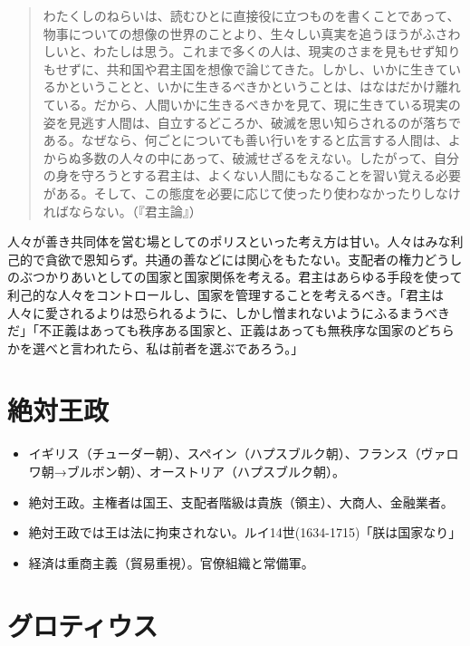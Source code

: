 \documentclass[uplatex,dvipdfmx]{jsarticle} \usepackage{mystyle}%
\begin{document}
\begin{quote}
  わたくしのねらいは、読むひとに直接役に立つものを書くことであって、物事についての想像の世界のことより、生々しい真実を追うほうがふさわしいと、わたしは思う。これまで多くの人は、現実のさまを見もせず知りもせずに、共和国や君主国を想像で論じてきた。しかし、いかに生きているかということと、いかに生きるべきかということは、はなはだかけ離れている。だから、人間いかに生きるべきかを見て、現に生きている現実の姿を見逃す人間は、自立するどころか、破滅を思い知らされるのが落ちである。なぜなら、何ごとについても善い行いをすると広言する人間は、よからぬ多数の人々の中にあって、破滅せざるをえない。したがって、自分の身を守ろうとする君主は、よくない人間にもなることを習い覚える必要がある。そして、この態度を必要に応じて使ったり使わなかったりしなければならない。（『君主論』）
\end{quote}


人々が善き共同体を営む場としてのポリスといった考え方は甘い。人々はみな利己的で貪欲で恩知らず。共通の善などには関心をもたない。支配者の権力どうしのぶつかりあいとしての国家と国家関係を考える。君主はあらゆる手段を使って利己的な人々をコントロールし、国家を管理することを考えるべき。「君主は人々に愛されるよりは恐られるように、しかし憎まれないようにふるまうべきだ」「不正義はあっても秩序ある国家と、正義はあっても無秩序な国家のどちらかを選べと言われたら、私は前者を選ぶであろう。」




\section{絶対王政}

\begin{itemize}
\item イギリス（チューダー朝）、スペイン（ハプスブルク朝）、フランス（ヴァロワ朝→ブルボン朝）、オーストリア（ハプスブルク朝）。

\item 絶対王政。主権者は国王、支配者階級は貴族（領主）、大商人、金融業者。
 \item 絶対王政では王は法に拘束されない。ルイ14世(1634-1715)「朕は国家なり」
\item 経済は重商主義（貿易重視）。官僚組織と常備軍。
\end{itemize}




 \section{グロティウス}
\end{document}
